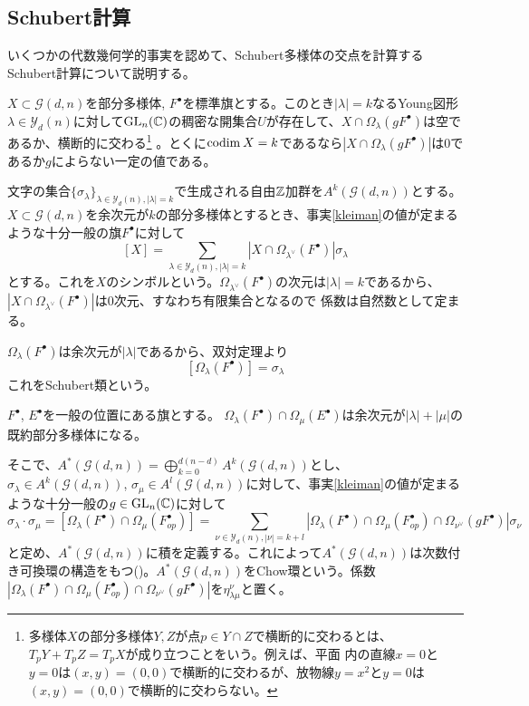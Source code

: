 \documentclass{ltjsreport}
\begin{document}
\subsection{Schubert計算}

いくつかの代数幾何学的事実を認めて、Schubert多様体の交点を計算するSchubert計算について説明する。

\begin{fact}\label{kleiman}
  $X\subset\mathcal{G}(d,n)$を部分多様体, $F^\bullet$を標準旗とする。このとき$|\lambda|=k$なるYoung図形$\lambda\in\mathcal{Y}_d(n)$に対して$\text{GL}_n(\mathbb{C})$の稠密な開集合$U$が存在して、$X\cap \Omega_{\lambda}(gF^\bullet)$は空であるか、横断的に交わる\footnote{
  多様体$X$の部分多様体$Y,Z$が点$p\in Y\cap Z$で横断的に交わるとは、$T_pY+T_pZ=T_pX$が成り立つことをいう。例えば、平面
  内の直線$x=0$と$y=0$は$(x,y)=(0,0)$で横断的に交わるが、放物線$y=x^2$と$y=0$は$(x,y)=(0,0)$で横断的に交わらない。
  }
  。とくに$\text{codim}\: X=k$であるなら$|X\cap \Omega_{\lambda}(gF^\bullet)|$は$0$であるか$g$によらない一定の値である。
\end{fact}

文字の集合$\{\sigma_\lambda\}_{\lambda\in\mathcal{Y}_d(n),|\lambda|=k}$で生成される自由$\mathbb{Z}$加群を$A^k(\mathcal{G}(d,n))$とする。$X\subset \mathcal{G}(d,n)$を余次元が$k$の部分多様体とするとき、事実\ref{kleiman}の値が定まるような十分一般の旗$F^\bullet$に対して
\[
[X]=\sum_{\lambda\in\mathcal{Y}_d(n),|\lambda|=k}|X\cap\Omega_{\lambda^\vee}(F^\bullet)|\sigma_\lambda  
\]
とする。これを$X$のシンボルという。$\Omega_{\lambda^\vee}(F^\bullet)$の次元は$|\lambda|=k$であるから、$|X\cap\Omega_{\lambda^\vee}(F^\bullet)|$は$0$次元、すなわち有限集合となるので
係数は自然数として定まる。

\begin{eg}
  $\Omega_{\lambda}(F^\bullet)$は余次元が$|\lambda|$であるから、双対定理より
  \[
    [\Omega_{\lambda}(F^\bullet)]=\sigma_{\lambda}
  \]
  これをSchubert類という。
\end{eg}

\begin{fact}
  $F^\bullet$, $E^\bullet$を一般の位置にある旗とする。
  $\Omega_{\lambda}(F^\bullet)\cap\Omega_{\mu}(E^\bullet)$は余次元が$|\lambda|+|\mu|$の既約部分多様体になる。
\end{fact}

そこで、$A^*(\mathcal{G}(d,n))=\bigoplus_{k=0}^{d(n-d)}A^k(\mathcal{G}(d,n))$とし、$\sigma_\lambda\in A^k(\mathcal{G}(d,n))$, $\sigma_\mu\in A^l(\mathcal{G}(d,n))$に対して、事実\ref{kleiman}の値が定まるような十分一般の$g\in\text{GL}_n(\mathbb{C})$に対して
\[
\sigma_\lambda\cdot\sigma_\mu
=[\Omega_{\lambda}(F^\bullet)\cap\Omega_{\mu}(F^\bullet_{op})]
=\sum_{\nu\in\mathcal{Y}_d(n),|\nu|=k+l}|\Omega_{\lambda}(F^\bullet)\cap\Omega_{\mu}(F^\bullet_{op})\cap\Omega_{\nu^\vee}(gF^\bullet)|\sigma_\nu
\]
と定め、$A^*(\mathcal{G}(d,n))$に積を定義する。これによって$A^*(\mathcal{G}(d,n))$は次数付き可換環の構造をもつ(\cite{3264})。$A^*(\mathcal{G}(d,n))$をChow環という。係数$|\Omega_{\lambda}(F^\bullet)\cap\Omega_{\mu}(F^\bullet_{op})\cap\Omega_{\nu^\vee}(gF^\bullet)|$を$\eta_{\lambda\mu}^\nu$と置く。
\end{document}

